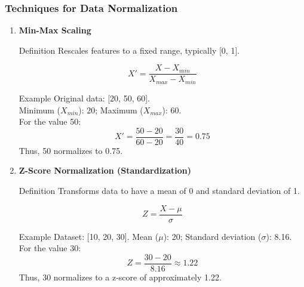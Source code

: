 \documentclass[aspectratio=169]{beamer}
\begin{document}
\begin{frame}[fragile]
    \frametitle{Techniques for Data Normalization}
    \begin{enumerate}
        \item \textbf{Min-Max Scaling}
        \begin{block}{Definition}
            Rescales features to a fixed range, typically [0, 1].
        \end{block}
        \begin{equation}
        X' = \frac{X - X_{min}}{X_{max} - X_{min}}
        \end{equation}
        
        \begin{block}{Example}
            Original data: [20, 50, 60].\\
            Minimum ($X_{min}$): 20; Maximum ($X_{max}$): 60.\\
            For the value 50:
            \[
            X' = \frac{50 - 20}{60 - 20} = \frac{30}{40} = 0.75
            \]
            Thus, 50 normalizes to 0.75.
        \end{block}
        
        \item \textbf{Z-Score Normalization (Standardization)}
        \begin{block}{Definition}
            Transforms data to have a mean of 0 and standard deviation of 1.
        \end{block}    
        \begin{equation}
        Z = \frac{X - \mu}{\sigma}
        \end{equation}
          
        \begin{block}{Example}
            Dataset: [10, 20, 30]. Mean ($\mu$): 20; Standard deviation ($\sigma$): 8.16.\\
            For the value 30:
            \[
            Z = \frac{30 - 20}{8.16} \approx 1.22
            \]
            Thus, 30 normalizes to a z-score of approximately 1.22.
        \end{block}
    \end{enumerate}
\end{frame}
\end{document}
